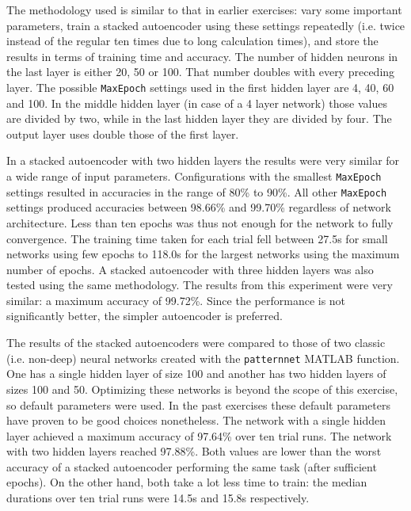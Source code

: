 \documentclass[a4, 10pt, twoside, twocolumn]{article}
\numberwithin{figure}{section}
\begin{document}
The methodology used is similar to that in earlier exercises: vary some important parameters, train a stacked autoencoder using these settings repeatedly (i.e. twice instead of the regular ten times due to long calculation times), and store the results in terms of training time and accuracy. The number of hidden neurons in the last layer is either 20, 50 or 100. That number doubles with every preceding layer. The possible \texttt{MaxEpoch} settings used in the first hidden layer are 4, 40, 60 and 100. In the middle hidden layer (in case of a 4 layer network) those values are divided by two, while in the last hidden layer they are divided by four. The output layer uses double those of the first layer.

In a stacked autoencoder with two hidden layers the results were very similar for a wide range of input parameters. Configurations with the smallest \texttt{MaxEpoch} settings resulted in accuracies in the range of 80\% to 90\%. All other \texttt{MaxEpoch} settings produced accuracies between 98.66\% and 99.70\% regardless of network architecture. Less than ten epochs was thus not enough for the network to fully convergence. The training time taken for each trial fell between 27.5s for small networks using few epochs to 118.0s for the largest networks using the maximum number of epochs. A stacked autoencoder with three hidden layers was also tested using the same methodology. The results from this experiment were very similar: a maximum accuracy of 99.72\%. Since the performance is not significantly better, the simpler autoencoder is preferred.

The results of the stacked autoencoders were compared to those of two classic (i.e. non-deep) neural networks created with the \texttt{patternnet} MATLAB function. One has a single hidden layer of size 100 and another has two hidden layers of sizes 100 and 50. Optimizing these networks is beyond the scope of this exercise, so default parameters were used. In the past exercises these default parameters have proven to be good choices nonetheless. The network with a single hidden layer achieved a maximum accuracy of 97.64\% over ten trial runs. The network with two hidden layers reached 97.88\%. Both values are lower than the worst accuracy of a stacked autoencoder performing the same task (after sufficient epochs). On the other hand, both take a lot less time to train: the median durations over ten trial runs were 14.5s and 15.8s respectively.
\end{document}
